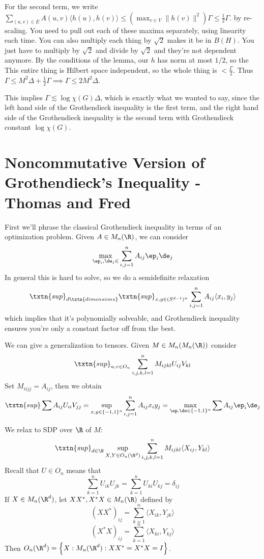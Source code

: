 For the second term, we write $\sum_{(u, v) \in E} A(u, v)\langle h(u), h(v) \rangle \leq (\max_{v \in V} \|h(v)\|^2)\Gamma \leq \frac{1}{2}\Gamma$. 
by re-scaling. You need to pull out each of these maxima separately, using linearity each time. You can also multiply each thing by $\sqrt{2}$ makes it be in $B(H)$. You just have to multiply by $\sqrt{2}$ and divide by $\sqrt{2}$ and they're not dependent anymore. By the conditions of the lemma, our $h$ has norm at most $1/2$, so the 
This entire thing is Hilbert space independent, so the whole thing is $< \frac{\Gamma}{2}$. Thus $\Gamma \leq M^2\Delta + \frac{1}{2}\Gamma \implies \Gamma \leq 2M^2\Delta$. 

This implies $\Gamma \lesssim \log \chi(G)\Delta$, which is exactly what we wanted to say, since the left hand side of the Grothendieck inequality is the first term, and the right hand side of the Grothendieck inequality is the second term with Grothendieck constant $\log \chi(G)$. 

\section{Noncommutative Version of Grothendieck's Inequality - Thomas and Fred}

First we'll phrase the classical Grothendieck inequality in terms of an optimization problem. Given $A \in M_n(\R)$, we can consider 
\[
\max_{\ep_i, \de_j \in } \sum_{i, j = 1}^n A_{ij} \ep_i\de_j
\]
In general this is hard to solve, so we do a semidefinite relaxation
\[
\txtn{sup}_{d \txtn{ dimensions}} \txtn{sup}_{x, y \in (S^{d - 1})^n}  \sum_{i, j = 1}^n A_{ij}\langle x_i, y_j \rangle
\]
which implies that it's polynomially solveable, and Grothendieck inequality ensures you're only a constant factor off from the best. 

We can give a generalization to tensors. Given $M \in M_n(M_n(\R))$ consider 
\[
\txtn{sup}_{u, v \in O_n} \sum_{i, j, k, l = 1}^n M_{ijkl} U_{ij}V_{kl}
\]
Set $M_{iijj} = A_{ij}$, then we obtain
\[
\txtn{sup} \sum A_{ij} U_{ii}V_{jj} = \sup_{x, y \in \{-1, 1\}^n} \sum_{i, j = 1}^n A_{ij}x_iy_j = \max_{\ep, \de \in \{-1, 1\}^n} \sum A_{ij} \ep_i \de_j
\]

We relax to SDP over $\R$ of $M$: 
\[
\txtn{sup}_{d \in \N} \sup_{X, Y \in O_n(\R^d)} \sum_{i, j, k, l = 1}^n M_{ijkl} \langle X_{ij}, Y_{kl} \rangle
\]
Recall that $U \in O_n$ means that 
\[
\sum_{k = 1}^n U_{ik} U_{jk} = \sum_{k = 1}^n U_{ki} U_{kj} = \delta_{ij}
\]
If $X \in M_n(\R^d)$, let $XX^*, X^*X \in M_n(\R)$ defined by 
\[
(XX^*)_{ij} = \sum_{k = 1}^n \langle X_{ik}, Y_{jk} \rangle
\]
\[
(X^*X)_{ij} = \sum_{k = 1}^n \langle X_{ki}, Y_{kj} \rangle
\]
Then $O_n(\R^d) = \left\{X: M_n(\R^d): XX^* = X^*X = I\right\}$.

